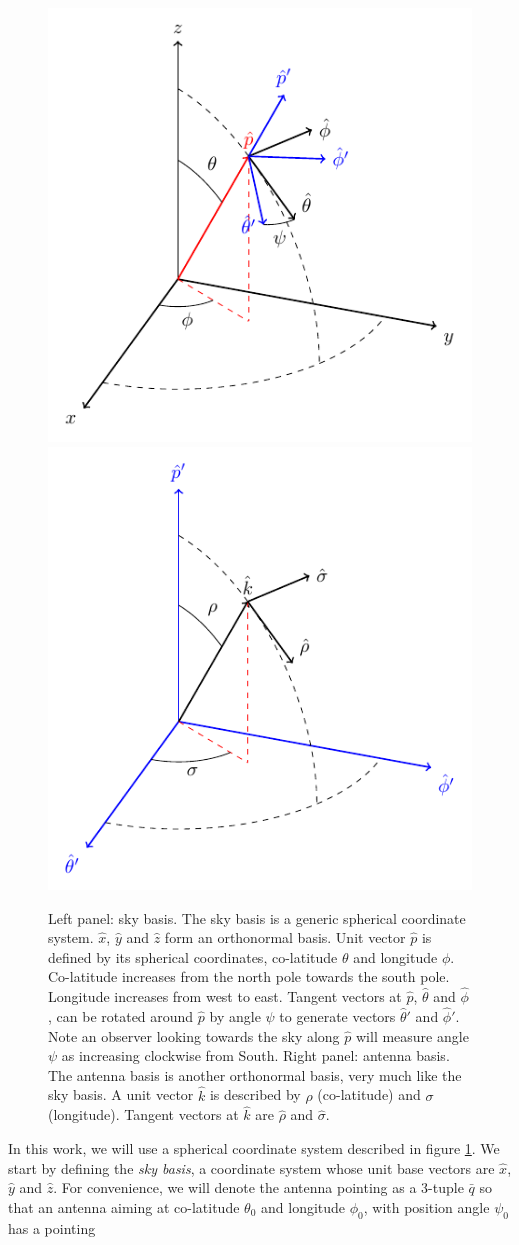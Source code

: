 \documentclass[a4paper,fleqn]{cas-dc}\sloppy
\begin{document}
	\begin{figure}
		\centering
		\includegraphics[width=0.43\linewidth]{tikz/sky_basis}	
		\includegraphics[width=0.43\linewidth]{tikz/beam_basis}
		\caption{Left panel: sky basis. The sky basis is a generic spherical coordinate system. $\hat{x}$, $\hat{y}$ and $\hat{z}$ form an orthonormal basis. Unit vector $\hat{p}$ is defined by its spherical coordinates, co-latitude $\theta$ and longitude $\phi$. Co-latitude increases from the north pole towards the south pole. Longitude increases from west to east. Tangent vectors at $\hat{p}$, $\hat{\theta}$ and $\hat{\phi}$, can be rotated around $\hat{p}$ by angle $\psi$ to generate vectors $\hat{\theta}'$ and $\hat{\phi}'$. Note an observer looking towards the sky along $\hat{p}$ will measure angle $\psi$ as increasing clockwise from South. Right panel: antenna basis. The antenna basis is another orthonormal basis, very much like the sky basis. A unit vector $\hat{k}$ is described by $\rho$ (co-latitude) and $\sigma$ (longitude). Tangent vectors at $\hat{k}$ are $\hat{\rho}$ and $\hat{\sigma}$. }
		\label{fig::sky_basis} 
	\end{figure}
	
	In this work, we will use a spherical coordinate system described in figure \ref{fig::sky_basis}. We start by defining the \textsl{sky basis}, a coordinate system whose unit base vectors are $\hat{x}$, $\hat{y}$ and $\hat{z}$. For convenience, we will denote the antenna pointing as a 3-tuple $\bar{q}$ so that an antenna aiming at co-latitude $\theta_0$ and longitude $\phi_0$, with position angle $\psi_0$ has a pointing 
	
\end{document}

